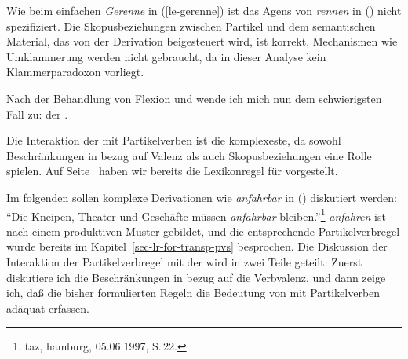 \noindent
Wie beim einfachen \emph{Gerenne} in (\ref{le-gerenne}) ist das
Agens von \emph{rennen} in () nicht spezifiziert. 
Die Skopusbeziehungen zwischen Partikel und dem semantischen Material,
das von der Derivation beigesteuert wird, ist korrekt, Mechanismen
wie Umklammerung werden nicht gebraucht, da in dieser Analyse kein
Klammerparadoxon vorliegt.

\begin{comment}
The derivation with object predicatives and resultatives is completely analogous:
The rule in (\ref{lr-gee-nom}) is applied to the lexical entry for the object predicative
\emph{find}- (`find') producing \stem{gefinde}, which is then combined with 
{\em schön\/} (`beautiful') to yield \emph{Schöngefinde}\iw{Schöngefinde} (`beautiful.finding').
In the case of resultative constructions, the listed entry for \emph{schlag}- (`to hit')
is fed into the lexical rule (\ref{lr-result}) for resultative constructions.
The output of this rule is the input to (\ref{lr-gee-nom}), yielding
\stem{geschlage}, which is then combined with \emph{tot} (`dead'),
resulting in \word{Totgeschlage} (`dead.beating').
\end{comment}

Nach der Behandlung von Flexion und \geen wende ich mich nun
dem schwierigsten Fall zu: der \bard.

\label{sec-bard-pv}

Die\iw{\bars|(}%
Interaktion der \bard mit Partikelverben ist die
komplexeste, da sowohl Beschränkungen in bezug auf Valenz
als auch Skopusbeziehungen eine Rolle spielen.
Auf Seite~\pageref{lr-bar-adj} haben wir bereits die
Lexikonregel  für \bard vorgestellt.

Im folgenden sollen komplexe Derivationen wie \emph{anfahrbar}
in () diskutiert werden:
\ea
 "`Die Kneipen,        Theater  und Geschäfte müssen \emph{anfahrbar} bleiben."'\footnote{
taz, hamburg, 05.06.1997, S.\,22.%
}
\z
\emph{anfahren} ist nach einem produktiven Muster gebildet, und die entsprechende
Partikelverbregel wurde bereits im Kapitel~\ref{sec-lr-for-transp-pvs} besprochen.
Die Diskussion der Interaktion der Partikelverbregel mit der \bard wird in zwei Teile geteilt: Zuerst
diskutiere ich die Beschränkungen in bezug auf die Verbvalenz, und dann zeige ich,
daß die bisher formulierten Regeln die Bedeutung von \barden mit Partikelverben adäquat
erfassen.

